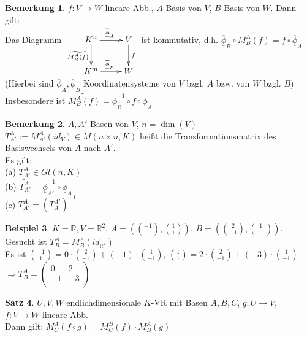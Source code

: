 \documentclass[10pt,a4paper,numbers=endperiod]{scrartcl}
\theoremstyle{definition}
\newtheorem{satz}{Satz}[section]
\newtheorem{bem}[satz]{Bemerkung}
\newtheorem{bsp}[satz]{Beispiel}
\def\RR{{\mathbb R}}
\begin{document}
\begin{bem}
	$f: V \rightarrow W$ lineare Abb., $A$ Basis von $V$, $B$ Basis von $W$. Dann gilt:\\
	Das Diagramm $\begin{xy}
	\xymatrix{
		K^n \ar[r]^{\overline{\underline{\phi}}_A} \ar[d]_{\widetilde{M_B^A(f)}}    &   V \ar[d]^f  \\
		K^m \ar[r]^{\overline{\underline{\phi}}_B}  &   W}
	\end{xy}$ ist kommutativ, d.h. $\overline{\underline{\phi}}_B \circ \widetilde{M_B^A(f)}  = f \circ \overline{\underline{\phi}}_A$ (Hierbei sind $\overline{\underline{\phi}}_A, \overline{\underline{\phi}}_B$ Koordinatensysteme von $V$ bzgl. $A$ bzw. von $W$ bzgl. $B$) Insbesondere ist $\widetilde{M_B^A(f)} = \overline{\underline{\phi}}_B^{-1} \circ f \circ \overline{\underline{\phi}}_A$
\end{bem}

\begin{bem}
	$A, A'$ Basen von $V$, $n=\dim(V)$\\
	$T_{A'}^A := M_{A'}^A(id_V) \in M(n \times n, K)$ heißt die Transformationsmatrix des Basiswechsels von $A$ nach $A'$.\\
	Es gilt:\\
	(a) $T_{A'}^A \in Gl(n,K)$\\
	(b) $\widetilde{T_{A'}^A} = \overline{\underline{\phi}}_{A'}^{-1} \circ \overline{\underline{\phi}}_A$\\
	(c) $T_{A'}^A = (T_{A}^{A'})^{-1}$
\end{bem}

\begin{bsp}
	$K=\RR, V=\RR^2$, $A= (\binom{-1}{1},\binom{1}{1})$, $B=(\binom{2}{-1},\binom{1}{-1})$. Gesucht ist $T_B^A = M_B^A (id_{\RR^2})$\\
	Es ist $\binom{-1}{1} = 0 \cdot \binom{2}{-1} + (-1) \cdot \binom{1}{-1}$, $\binom{1}{1} = 2 \cdot \binom{2}{-1} + (-3) \cdot \binom{1}{-1}$ $\Rightarrow T_B^A = \begin{pmatrix}
	0&2\\
	-1&-3\\
	\end{pmatrix}$	
\end{bsp}

\begin{satz}
	$U,V,W$ endlichdimensionale $K$-VR mit Basen $A,B,C$, $g:U \rightarrow V$, $f:V \rightarrow W$ lineare Abb.\\
	Dann gilt: $M_C^A(f\circ g) = M_C^B(f) \cdot M_B^A(g)$
\end{satz}
\end{document}
